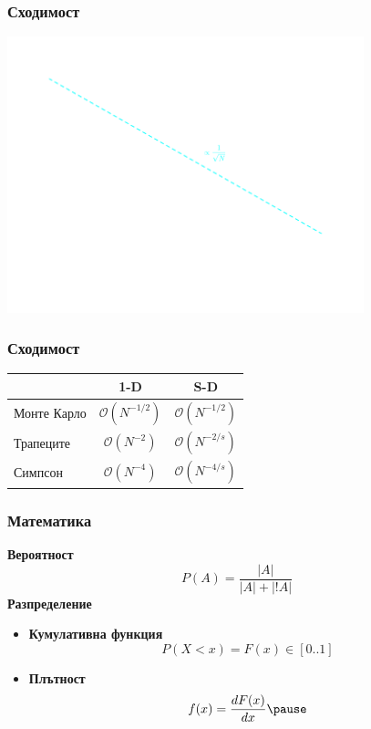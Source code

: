 \documentclass[serif,mathserif,14pt]{beamer}
\begin{document}
\begin{frame}
  \frametitle{Сходимост}
    \includegraphics[height=8.0cm]{mc_error2.png}
\end{frame}
\begin{frame}
  \frametitle{Сходимост}
  \begin{table}
  \begin{tabular}{l | c | c }
            &   1-D  &  S-D   \\
\hline \hline
Монте Карло & $\mathcal{O}(N^{-1/2})$    & $\mathcal{O}(N^{-1/2})$ \\ \pause 
Трапеците   & $\mathcal{O}(N^{-2})$      & $\mathcal{O}(N^{-2/s})$ \\ \pause
Симпсон     & $\mathcal{O}(N^{-4})$      & $\mathcal{O}(N^{-4/s})$ \\ 
\end{tabular}
\end{table}
\end{frame}



\begin{frame}
  \frametitle{Математика}
  \textbf{Вероятност}
  \begin{equation*}
      P(A) = \frac{|A|}{|A| + |!A|}
  \end{equation*}
  \pause
  \textbf{Разпределение}
  \begin{itemize}
  \item \textbf{Кумулативна функция}
  \begin{equation*}
      P(X < x) = F(x) \in [0..1]
  \end{equation*}
  \pause
  \item \textbf{Плътност}
  \begin{equation*}
      f(x) = \frac{dF(x)}{dx} \pause
  \end{equation*}
  \end{itemize}
\end{frame}
\end{document}
